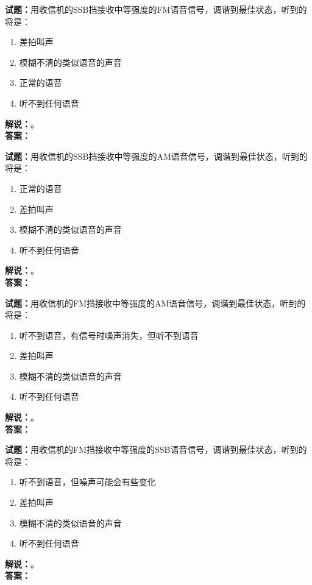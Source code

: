 \documentclass{ctexbook}
\begin{document}
\vspace{\baselineskip}

\noindent\textbf{试题：}用收信机的SSB挡接收中等强度的FM语音信号，调谐到最佳状态，听到的将是：
\begin{enumerate}[leftmargin=3em]
  \item 差拍叫声
  \item 模糊不清的类似语音的声音
  \item 正常的语音
  \item 听不到任何语音
\end{enumerate}
\noindent\textbf{解说：}\textbf{}。\\\noindent\textbf{答案：}

\vspace{\baselineskip}

\noindent\textbf{试题：}用收信机的SSB挡接收中等强度的AM语音信号，调谐到最佳状态，听到的将是：
\begin{enumerate}[leftmargin=3em]
  \item 正常的语音
  \item 差拍叫声
  \item 模糊不清的类似语音的声音
  \item 听不到任何语音
\end{enumerate}
\noindent\textbf{解说：}\textbf{}。\\\noindent\textbf{答案：}

\vspace{\baselineskip}

\noindent\textbf{试题：}用收信机的FM挡接收中等强度的AM语音信号，调谐到最佳状态，听到的将是：
\begin{enumerate}[leftmargin=3em]
  \item 听不到语音，有信号时噪声消失，但听不到语音
  \item 差拍叫声
  \item 模糊不清的类似语音的声音
  \item 听不到任何语音
\end{enumerate}
\noindent\textbf{解说：}\textbf{}。\\\noindent\textbf{答案：}

\vspace{\baselineskip}

\noindent\textbf{试题：}用收信机的FM挡接收中等强度的SSB语音信号，调谐到最佳状态，听到的将是：
\begin{enumerate}[leftmargin=3em]
  \item 听不到语音，但噪声可能会有些变化
  \item 差拍叫声
  \item 模糊不清的类似语音的声音
  \item 听不到任何语音
\end{enumerate}
\noindent\textbf{解说：}\textbf{}。\\\noindent\textbf{答案：}
\end{document}
